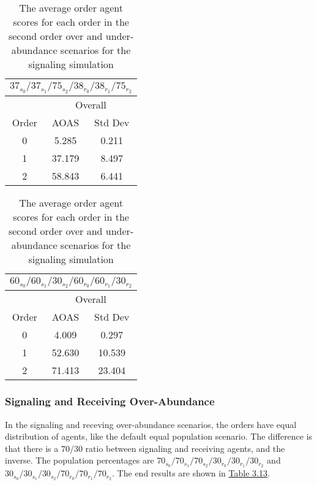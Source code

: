 \begin{table}[h]
    \centering
    \begin{tabular}{|c|c|c|}
    \hline
    \multicolumn{3}{|c|}{$37_{s_{0}}/37_{s_{1}}/75_{s_{2}}/38_{r_{0}}/38_{r_{1}}/75_{r_{2}}$} \\
    \hline
    \multicolumn{1}{|c|}{} & \multicolumn{2}{|c|}{Overall} \\
    \hline
    Order & AOAS & Std Dev \\
    \hline
    0     & 5.285   & 0.211    \\
    1     & 37.179  & 8.497   \\
    2     & 58.843  & 6.441   \\
    \hline
    \end{tabular}
    \qquad
    \begin{tabular}{|c|c|c|}
    \hline
    \multicolumn{3}{|c|}{$60_{s_{0}}/60_{s_{1}}/30_{s_{2}}/60_{r_{0}}/60_{r_{1}}/30_{r_{2}}$} \\
    \hline
    \multicolumn{1}{|c|}{} & \multicolumn{2}{|c|}{Overall} \\
    \hline
    Order & AOAS & Std Dev \\
    \hline
    0     & 4.009   & 0.297    \\
    1     & 52.630  & 10.539   \\
    2     & 71.413  & 23.404   \\
    \hline
    \end{tabular}
    \caption{The average order agent scores for each order in the second order over and under-abundance scenarios for the signaling simulation}
    \label{table:sig-second-order-overall}
\end{table}

\subsubsection{Signaling and Receiving Over-Abundance}

In the signaling and receving over-abundance scenarios, the orders have equal distribution of agents, like the default equal population scenario. The difference is that there is a $70/30$ ratio between signaling and receiving agents, and the inverse. The population percentages are $70_{s_{0}}/70_{s_{1}}/70_{s_{2}}/30_{r_{0}}/30_{r_{1}}/30_{r_{2}}$ and $30_{s_{0}}/30_{s_{1}}/30_{s_{2}}/70_{r_{0}}/70_{r_{1}}/70_{r_{2}}$. The end results are shown in \hyperref[table:sig-over-abundance]{Table 3.13}.


